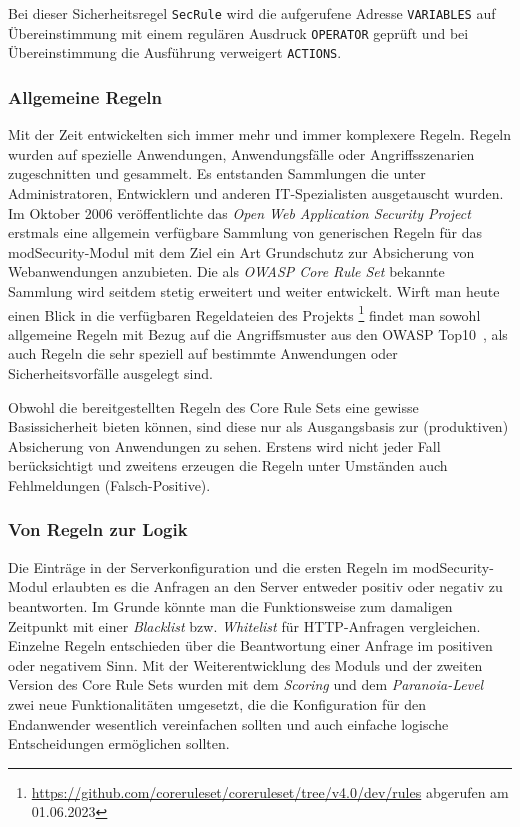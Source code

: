 Bei dieser Sicherheitsregel \verb=SecRule= wird die aufgerufene Adresse \verb=VARIABLES= auf Übereinstimmung mit einem regulären Ausdruck \verb=OPERATOR= geprüft und bei Übereinstimmung die Ausführung verweigert \verb=ACTIONS=.

\subsubsection{Allgemeine Regeln}
Mit der Zeit entwickelten sich immer mehr und immer komplexere Regeln. Regeln wurden auf spezielle Anwendungen, Anwendungsfälle oder Angriffsszenarien zugeschnitten und gesammelt. Es entstanden Sammlungen die unter Administratoren, Entwicklern und anderen IT-Spezialisten ausgetauscht wurden.
Im Oktober 2006 veröffentlichte das \emph{Open Web Application Security Project} erstmals eine allgemein verfügbare Sammlung von generischen Regeln für das modSecurity-Modul mit dem Ziel ein Art Grundschutz zur Absicherung von Webanwendungen anzubieten. Die als \emph{OWASP Core Rule Set} bekannte Sammlung wird seitdem stetig erweitert und weiter entwickelt. Wirft man heute einen Blick in die verfügbaren Regeldateien des Projekts \footnote{\url{https://github.com/coreruleset/coreruleset/tree/v4.0/dev/rules} abgerufen am 01.06.2023} findet man sowohl allgemeine Regeln mit Bezug auf die Angriffsmuster aus den OWASP Top10~\cite{owasp10}, als auch Regeln die sehr speziell auf bestimmte Anwendungen oder Sicherheitsvorfälle ausgelegt sind.

Obwohl die bereitgestellten Regeln des Core Rule Sets eine gewisse Basissicherheit bieten können, sind diese nur als Ausgangsbasis zur (produktiven) Absicherung von Anwendungen zu sehen. Erstens wird nicht jeder Fall berücksichtigt und zweitens erzeugen die Regeln unter Umständen auch Fehlmeldungen (Falsch-Positive).

\subsubsection{Von Regeln zur Logik}
\label{sec:rullog}
Die Einträge in der Serverkonfiguration und die ersten Regeln im modSecurity-Modul erlaubten es die Anfragen an den Server entweder positiv oder negativ zu beantworten. Im Grunde könnte man die Funktionsweise zum damaligen Zeitpunkt mit einer \emph{Blacklist} bzw. \emph{Whitelist} für HTTP-Anfragen vergleichen. Einzelne Regeln entschieden über die Beantwortung einer Anfrage im positiven oder negativem Sinn. Mit der Weiterentwicklung des Moduls und der zweiten Version des Core Rule Sets wurden mit dem \emph{Scoring} und dem \emph{Paranoia-Level} zwei neue Funktionalitäten umgesetzt, die die Konfiguration für den Endanwender wesentlich vereinfachen sollten und auch einfache logische Entscheidungen ermöglichen sollten.\\

